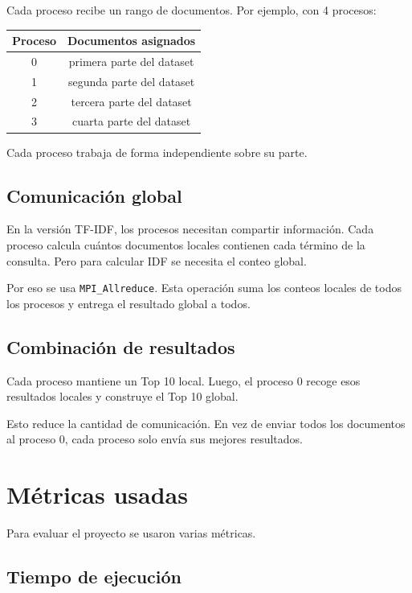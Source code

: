 \documentclass[12pt,letterpaper]{article}
\begin{document}
Cada proceso recibe un rango de documentos. Por ejemplo, con 4 procesos:

\begin{center}
\begin{tabular}{cc}
\toprule
Proceso & Documentos asignados \\
\midrule
0 & primera parte del dataset \\
1 & segunda parte del dataset \\
2 & tercera parte del dataset \\
3 & cuarta parte del dataset \\
\bottomrule
\end{tabular}
\end{center}

Cada proceso trabaja de forma independiente sobre su parte.

\subsection{Comunicación global}

En la versión TF-IDF, los procesos necesitan compartir información. Cada proceso calcula cuántos documentos locales contienen cada término de la consulta. Pero para calcular IDF se necesita el conteo global.

Por eso se usa \texttt{MPI\_Allreduce}. Esta operación suma los conteos locales de todos los procesos y entrega el resultado global a todos.

\subsection{Combinación de resultados}

Cada proceso mantiene un Top 10 local. Luego, el proceso 0 recoge esos resultados locales y construye el Top 10 global.

Esto reduce la cantidad de comunicación. En vez de enviar todos los documentos al proceso 0, cada proceso solo envía sus mejores resultados.

\section{Métricas usadas}

Para evaluar el proyecto se usaron varias métricas.

\subsection{Tiempo de ejecución}
\end{document}

